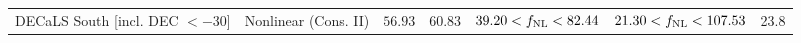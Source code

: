 \begin{table}
\begin{center}
\begin{tabular}{llccccc}
DECaLS South [incl. DEC $< -30$] & Nonlinear (Cons. II)                & $ 56.93$& $ 60.83$& $ 39.20<f_{\rm NL}< 82.44$& $ 21.30<f_{\rm NL}<107.53$ &   23.8\\
%
%
%
%
%    
    \end{tabular}
  \end{center}
\end{table}


